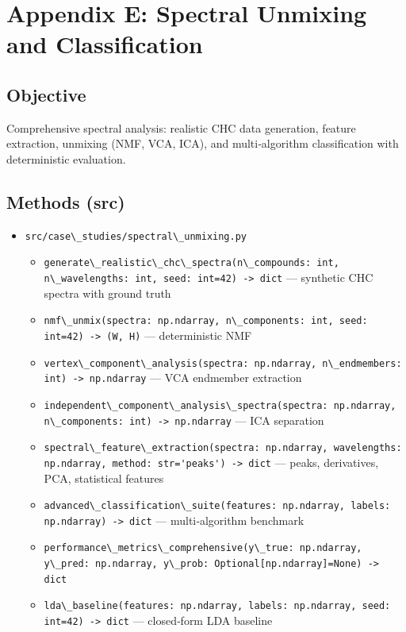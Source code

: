 \documentclass[
  13pt,
  a4paperpaper,
  12pt]{article}
\newcommand{\passthrough}[1]{#1}
\providecommand{\tightlist}{%
  \setlength{\itemsep}{0pt}\setlength{\parskip}{0pt}}
\let\oldsection\section
\renewcommand{\section}{\clearpage\oldsection}
\begin{document}
\section{Appendix E: Spectral Unmixing and
Classification}\label{sec:app_spectral_unmixing}

\subsection{Objective}\label{objective-4}

Comprehensive spectral analysis: realistic CHC data generation, feature
extraction, unmixing (NMF, VCA, ICA), and multi‑algorithm classification
with deterministic evaluation.

\subsection{Methods (src)}\label{methods-src-4}

\begin{itemize}
\tightlist
\item
  \passthrough{\lstinline!src/case\_studies/spectral\_unmixing.py!}

  \begin{itemize}
  \tightlist
  \item
    \passthrough{\lstinline!generate\_realistic\_chc\_spectra(n\_compounds: int, n\_wavelengths: int, seed: int=42) -> dict!}
    --- synthetic CHC spectra with ground truth
  \item
    \passthrough{\lstinline!nmf\_unmix(spectra: np.ndarray, n\_components: int, seed: int=42) -> (W, H)!}
    --- deterministic NMF
  \item
    \passthrough{\lstinline!vertex\_component\_analysis(spectra: np.ndarray, n\_endmembers: int) -> np.ndarray!}
    --- VCA endmember extraction
  \item
    \passthrough{\lstinline!independent\_component\_analysis\_spectra(spectra: np.ndarray, n\_components: int) -> np.ndarray!}
    --- ICA separation
  \item
    \passthrough{\lstinline!spectral\_feature\_extraction(spectra: np.ndarray, wavelengths: np.ndarray, method: str='peaks') -> dict!}
    --- peaks, derivatives, PCA, statistical features
  \item
    \passthrough{\lstinline!advanced\_classification\_suite(features: np.ndarray, labels: np.ndarray) -> dict!}
    --- multi‑algorithm benchmark
  \item
    \passthrough{\lstinline!performance\_metrics\_comprehensive(y\_true: np.ndarray, y\_pred: np.ndarray, y\_prob: Optional[np.ndarray]=None) -> dict!}
  \item
    \passthrough{\lstinline!lda\_baseline(features: np.ndarray, labels: np.ndarray, seed: int=42) -> dict!}
    --- closed‑form LDA baseline
  \end{itemize}
\end{itemize}
\end{document}
